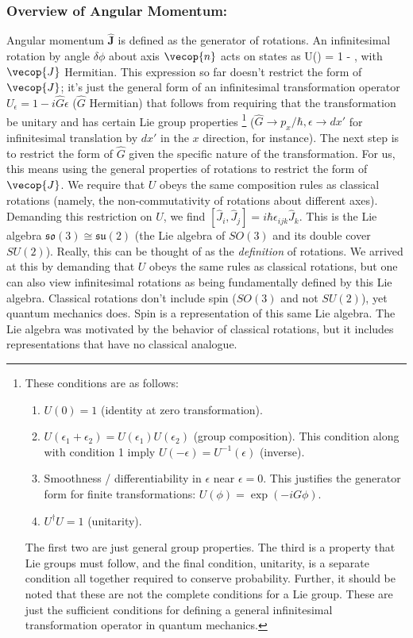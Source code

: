 \subsubsection{Overview of Angular Momentum:}
Angular momentum $\hat{\mathbf{J}}$ is defined as the generator of rotations. An infinitesimal rotation by angle $\delta\phi$ about axis $\vecop{n}$ acts on states as
\bea
    U(\delta\phi) = 1 - \delta\phi{}\cdot{},
\eea
with $\vecop{J}$ Hermitian. This expression so far doesn't restrict the form of $\vecop{J}$; it's just the general form of an infinitesimal transformation operator $U_\epsilon=1-i\hat{G}\epsilon$ ($\hat{G}$ Hermitian) that follows from requiring that the transformation be unitary and has certain Lie group properties \footnote{
These conditions are as follows: 
\begin{enumerate}
    \item $U(0)=1$ (identity at zero transformation).
    \item $U(\epsilon_1+\epsilon_2)=U(\epsilon_1)U(\epsilon_2)$ (group composition). This condition along with condition 1 imply $U(-\epsilon)=U^{-1}(\epsilon)$ (inverse).
    \item Smoothness / differentiability in $\epsilon$ near $\epsilon=0$. This justifies the generator form for finite transformations: $U(\phi)=\exp(-iG\phi)$.
    \item $U^\dagger U=1$ (unitarity).
\end{enumerate}
The first two are just general group properties. The third is a property that Lie groups must follow, and the final condition, unitarity, is a separate condition all together required to conserve probability. Further, it should be noted that these are not the complete conditions for a Lie group. These are just the sufficient conditions for defining a general infinitesimal transformation operator in quantum mechanics. 
} ($\hat{G}\rightarrow p_x/\hbar, \epsilon\rightarrow dx'$ for infinitesimal translation by $dx'$ in the $x$ direction, for instance). The next step is to restrict the form of $\hat{G}$ given the specific nature of the transformation. For us, this means using the general properties of rotations to restrict the form of $\vecop{J}$. We require that $U$ obeys the same composition rules as classical rotations (namely, the non-commutativity of rotations about different axes). Demanding this restriction on $U$, we find $[\hat{J}_i, \hat{J}_j]=i\hbar \epsilon_{ijk}\hat{J}_k$. This is the Lie algebra $\mathfrak{so}(3)\cong \mathfrak{su}(2)$ (the Lie algebra of $SO(3)$ and its double cover $SU(2)$). Really, this can be thought of as the \textit{definition} of rotations. We arrived at this by demanding that $U$ obeys the same rules as classical rotations, but one can also view infinitesimal rotations as being fundamentally defined by this Lie algebra. Classical rotations don't include spin ($SO(3)$ and not $SU(2)$), yet quantum mechanics does. Spin is a representation of this same Lie algebra. The Lie algebra was motivated by the behavior of classical rotations, but it includes representations that have no classical analogue.\\

